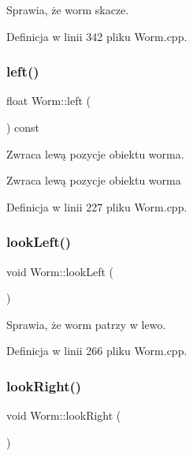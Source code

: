 Sprawia, że worm skacze. 



Definicja w linii 342 pliku Worm.\+cpp.

\mbox{\label{class_worm_ab517b492de0e583254c288cc583cbeb1}} 
\subsubsection{\texorpdfstring{left()}{left()}}
{\footnotesize\ttfamily float Worm\+::left (\begin{DoxyParamCaption}{ }\end{DoxyParamCaption}) const}



Zwraca lewą pozycje obiektu worma. 

\begin{DoxyReturn}{Zwraca}
lewą pozycje obiektu worma 
\end{DoxyReturn}


Definicja w linii 227 pliku Worm.\+cpp.

\mbox{\label{class_worm_a84fbbdac67be083a5492bf38cf83544b}} 
\subsubsection{\texorpdfstring{look\+Left()}{lookLeft()}}
{\footnotesize\ttfamily void Worm\+::look\+Left (\begin{DoxyParamCaption}{ }\end{DoxyParamCaption})}



Sprawia, że worm patrzy w lewo. 



Definicja w linii 266 pliku Worm.\+cpp.

\mbox{\label{class_worm_a4dbc714c26c5b09a94bd53f10172b4c1}} 
\subsubsection{\texorpdfstring{look\+Right()}{lookRight()}}
{\footnotesize\ttfamily void Worm\+::look\+Right (\begin{DoxyParamCaption}{ }\end{DoxyParamCaption})}



